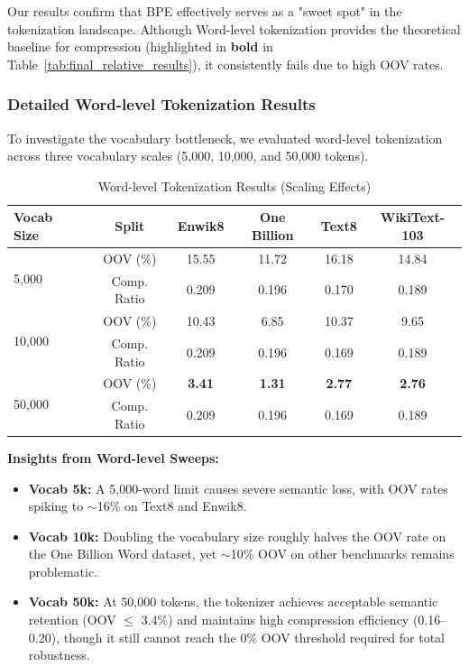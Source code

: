 

Our results confirm that BPE effectively serves as a "sweet spot" in the tokenization landscape. Although Word-level tokenization provides the theoretical baseline for compression (highlighted in \textbf{bold} in Table~\ref{tab:final_relative_results}), it consistently fails due to high OOV rates.

\subsubsection{Detailed Word-level Tokenization Results}
To investigate the vocabulary bottleneck, we evaluated word-level tokenization across three vocabulary scales (5,000, 10,000, and 50,000 tokens).

\begin{table}[H]
\centering
\caption{Word-level Tokenization Results (Scaling Effects)}
\renewcommand{\arraystretch}{1.1}
\begin{tabular}{|l|c|c|c|c|c|}
\hline
\textbf{Vocab Size} & \textbf{Split} & \textbf{Enwik8} & \textbf{One Billion} & \textbf{Text8} & \textbf{WikiText-103} \\ \hline
\multirow{2}{*}{5,000} & OOV (\%) & 15.55 & 11.72 & 16.18 & 14.84 \\ \cline{2-6}
& Comp. Ratio & 0.209 & 0.196 & 0.170 & 0.189 \\ \hline
\multirow{2}{*}{10,000} & OOV (\%) & 10.43 & 6.85 & 10.37 & 9.65 \\ \cline{2-6}
& Comp. Ratio & 0.209 & 0.196 & 0.169 & 0.189 \\ \hline
\multirow{2}{*}{50,000} & OOV (\%) & \textbf{3.41} & \textbf{1.31} & \textbf{2.77} & \textbf{2.76} \\ \cline{2-6}
& Comp. Ratio & 0.209 & 0.196 & 0.169 & 0.189 \\ \hline
\end{tabular}
\end{table}

\textbf{Insights from Word-level Sweeps:}
\begin{itemize}
    \item \textbf{Vocab 5k:} A 5,000-word limit causes severe semantic loss, with OOV rates spiking to $\sim$16\% on Text8 and Enwik8.
    \item \textbf{Vocab 10k:} Doubling the vocabulary size roughly halves the OOV rate on the One Billion Word dataset, yet $\sim$10\% OOV on other benchmarks remains problematic.
    \item \textbf{Vocab 50k:} At 50,000 tokens, the tokenizer achieves acceptable semantic retention (OOV $\le$ 3.4\%) and maintains high compression efficiency (0.16--0.20), though it still cannot reach the 0\% OOV threshold required for total robustness.
\end{itemize}

